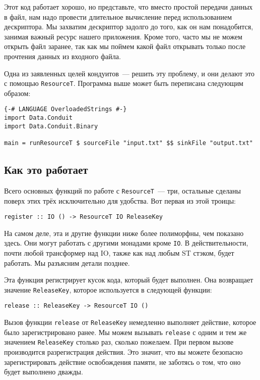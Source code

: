 Этот код работает хорошо, но представьте, что вместо простой передачи данных в файл, нам
надо провести длительное вычисление перед использованием дескриптора. Мы захватим
дескриптор задолго до того, как он нам понадобится, занимая важный ресурс нашего
приложения. Кроме того, часто мы не можем открыть файл заранее, так как мы поймем какой файл
открывать только после прочтения данных из входного файла.

Одна из заявленных целей кондуитов~--- решить эту проблему, и они делают это с помощью \lstinline'ResourceT'.
Программа выше может быть переписана следующим образом:
\begin{lstlisting}
{-# LANGUAGE OverloadedStrings #-}
import Data.Conduit
import Data.Conduit.Binary

main = runResourceT $ sourceFile "input.txt" $$ sinkFile "output.txt"
\end{lstlisting}

\subsection{Как это работает}
Всего основных функций по работе с \lstinline'ResourceT'~--- три, остальные
сделаны поверх этих трёх исключительно для удобства. Вот первая из этой троицы:
\begin{lstlisting}
register :: IO () -> ResourceT IO ReleaseKey
\end{lstlisting}

\begin{remark}
На самом деле, эта и другие функции ниже более полиморфны, чем показано здесь. Они могут работать с другими монадами кроме \verb'IO'. В действительности, почти любой трансформер над
IO, также как над любым ST стэком, будет работать. Мы разъясним детали позднее.
\end{remark}

Эта функция регистрирует кусок кода, который будет выполнен. Она
возвращает значение \lstinline'ReleaseKey', которое используется в следующей функции:

\begin{lstlisting}
release :: ReleaseKey -> ResourceT IO ()
\end{lstlisting}
Вызов функции \verb=release= от \verb'ReleaseKey' немедленно выполняет действие, которое было
зарегистрировано ранее. Мы можем вызывать \verb=release= с одним и тем же значением 
\lstinline'ReleaseKey'
столько раз, сколько пожелаем. При первом вызове производится разрегистрация действия. Это
значит, что вы можете безопасно зарегистрировать действие освобождения памяти, не
заботясь о том, что оно будет выполнено дважды.

